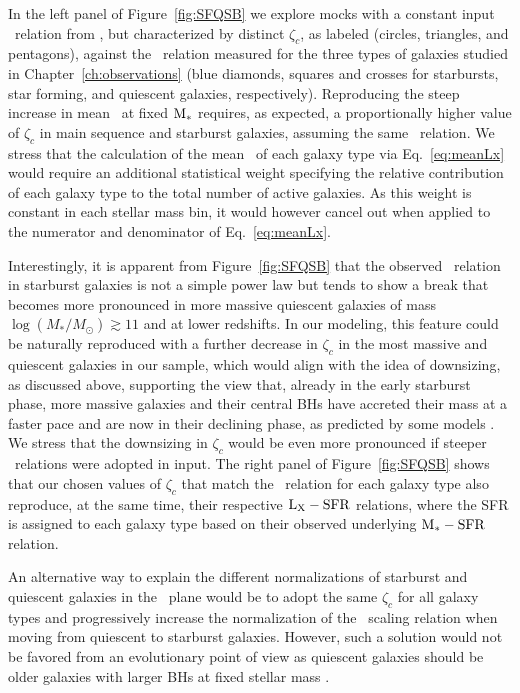 In the left panel of Figure~\ref{fig:SFQSB} we explore mocks with a constant input \MBHMS\ relation from \citet{2015ApJ...813...82R}, but characterized by distinct $\zeta_c$, as labeled (circles, triangles, and pentagons), against the \LXMS\ relation measured for the three types of galaxies studied in Chapter~\ref{ch:observations} (blue diamonds, squares and crosses for starbursts, star forming, and quiescent galaxies, respectively). Reproducing the steep increase in mean \LX\ at fixed ${\rm M}_*$ requires, as expected, a proportionally higher value of $\zeta_c$ in main sequence and starburst galaxies, assuming the same \MBHMS\ relation. We stress that the calculation of the mean \LX\ of each galaxy type via Eq.~\ref{eq:meanLx} would require an additional statistical weight specifying the relative contribution of each galaxy type to the total number of active galaxies. As this weight is constant in each stellar mass bin, it would however cancel out when applied to the numerator and denominator of Eq.~\ref{eq:meanLx}.

Interestingly, it is apparent from Figure~\ref{fig:SFQSB} that the observed \LXMS\ relation in starburst galaxies is not a simple power law but tends to show a break that becomes more pronounced in more massive quiescent galaxies of mass $\log (M_*/M_{\odot}) \gtrsim 11$ and at lower redshifts. In our modeling, this feature could be naturally reproduced with a further decrease in $\zeta_c$ in the most massive and quiescent galaxies in our sample, which would align with the idea of downsizing, as discussed above, supporting the view that, already in the early starburst phase, more massive galaxies and their central BHs have accreted their mass at a faster pace and are now in their declining phase, as predicted by some models \citep[e.g.,][]{Lapi18}. We stress that the downsizing in $\zeta_c$ would be even more pronounced if steeper \MBHMS\ relations were adopted in input. The right panel of Figure~\ref{fig:SFQSB} shows that our chosen values of $\zeta_c$ that match the \LXMS\ relation for each galaxy type also reproduce, at the same time, their respective ${\rm L}_{\rm X}-{\rm SFR}$ relations, where the SFR is assigned to each galaxy type based on their observed underlying ${\rm M}_*-{\rm SFR}$ relation. 

An alternative way to explain the different normalizations of starburst and quiescent galaxies in the \LXMS\ plane would be to adopt the same $\zeta_c$ for all galaxy types and progressively increase the normalization of the \MBHMS\ scaling relation when moving from quiescent to starburst galaxies.  
However, such a solution would not be favored from an evolutionary point of view as quiescent galaxies should be older galaxies with larger BHs at fixed stellar mass \citep[e.g.,][]{Ciras05,Granato06,Lapi06,shankar06,Lapi18}.

